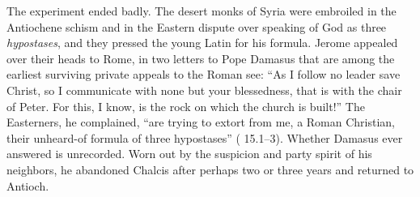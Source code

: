 The experiment ended badly. The desert monks of Syria were embroiled in the
Antiochene schism and in the Eastern dispute over speaking of God as three
\textit{hypostases}, and they pressed the young Latin for his formula. Jerome
appealed over their heads to Rome, in two letters to Pope Damasus that are
among the earliest surviving private appeals to the Roman see: ``As I follow
no leader save Christ, so I communicate with none but your blessedness, that
is with the chair of Peter. For this, I know, is the rock on which the church
is built!'' The Easterners, he complained, ``are trying to extort from me, a
Roman Christian, their unheard-of formula of three hypostases''
( 15.1--3). Whether Damasus ever answered is unrecorded. Worn
out by the suspicion and party spirit of his neighbors, he abandoned Chalcis
after perhaps two or three years and returned to Antioch.
